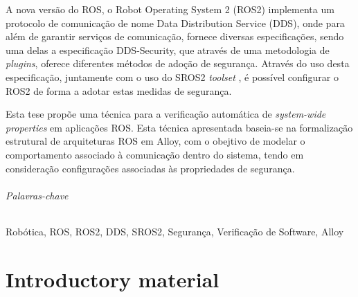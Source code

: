 \documentclass[
  oneside,
  11pt, a4paper,
  footinclude=true,
  headinclude=true,
  cleardoublepage=empty
]{scrbook}
\begin{document}
	A nova versão do ROS, o Robot Operating System 2 (ROS2) implementa um protocolo de comunicação de nome Data Distribution Service (DDS)\cite{3}, onde para além de garantir serviços de comunicação, fornece diversas especificações, sendo uma delas a especificação DDS-Security, que através de uma metodologia de \textit{plugins}, oferece diferentes métodos de adoção de segurança. Através do uso desta especificação, juntamente com o uso do SROS2 \textit{toolset} \cite{ros-dds-integration}, é possível configurar o ROS2 de forma a adotar estas medidas de segurança.

	Esta tese propõe uma técnica para a verificação automática de \textit{system-wide properties} em aplicações ROS. Esta técnica apresentada baseia-se na formalização estrutural de arquiteturas ROS em Alloy\cite{alloy-DJ}, com o obejtivo de modelar o comportamento associado à comunicação dentro do sistema, tendo em consideração configurações associadas às propriedades de segurança. 
	
	
\paragraph{Palavras-chave} Robótica, ROS, ROS2, DDS, SROS2, Segurança, Verificação de Software, Alloy


	\cleardoublepage

	\setcounter{page}{3}

	\cleardoublepage
	\tableofcontents

	\cleardoublepage
	\listoffigures



	\cleardoublepage
	\setcounter{page}{3}

\part{Introductory material}










\end{document}
